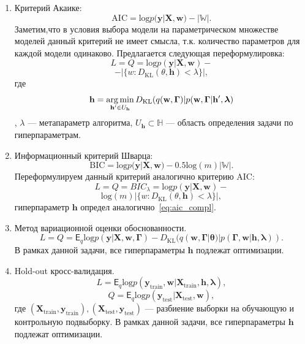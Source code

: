 \begin{enumerate}
\item Критерий Акаике:
\[
   \text{AIC} =  \text{log}p(\mathbf{y}|\mathbf{X}, \mathbf{w}) - |\mathbb{W}|.
\]
Заметим,что в условия выбора модели на параметрическом множестве моделей данный критерий не имеет смысла, т.к. количество параметров для каждой модели одинаково. Предлагается следующая переформулировка:
\begin{equation}
\label{eq:optim_aic}
    L = Q = \text{log}p(\mathbf{y}|\mathbf{X}, \mathbf{w}) - 
\end{equation}
\[
-|\{w: D_\text{KL}(\theta, \mathbf{h})<\lambda\}|,
\]
где 
\begin{equation}
\label{eq:aic_compl}
 \mathbf{h} = \operatorname*{arg\,min}_{\mathbf{h}' \in U_\mathbf{h}} D_\text{KL}(q(\mathbf{w}, \boldsymbol{\Gamma}) | p(\mathbf{w}, \boldsymbol{\Gamma}|\mathbf{h}',\boldsymbol{\lambda})\end{equation}, $\lambda$ --- метапараметр алгоритма, $U_\mathbf{h}  \subset \mathbb{H}$ --- область определения задачи по гиперпараметрам.

\item Информационный критерий Шварца:
\[
    \text{BIC} = \text{log}p(\mathbf{y}|\mathbf{X}, \mathbf{w}) - 0.5\text{log}(m)|\mathbb{W}|.
\]
Переформулируем данный критерий аналогично критерию AIC:
\begin{equation}
\label{eq:optim_bic}
    L = Q = BIC_{\lambda} = \text{log}p(\mathbf{y}|\mathbf{X}, \mathbf{w}) -
\end{equation}
\[
 \text{log}(m)|\{w: D_\text{KL}(\theta, \mathbf{h})<\lambda\}|,
\]
гиперпараметр $\mathbf{h}$ определ аналогично~\eqref{eq:aic_compl}.

\item Метод вариационной оценки обоснованности.
\begin{equation}
\label{eq:optim_elbo_method}   
    L = Q = \mathsf{E}_q \text{log}p(\mathbf{y}|\mathbf{X}, \mathbf{w}, \boldsymbol{\Gamma}) - D_\text{KL}(q(\mathbf{w}, \boldsymbol{\Gamma}|\boldsymbol{\theta})|p(\boldsymbol{\Gamma}, \mathbf{w}|\mathbf{h},\boldsymbol{\lambda})).
\end{equation}
В рамках данной задачи, все гиперпараметры $\mathbf{h}$ подлежат оптимизации.

\item Hold-out кросс-валидация.
\begin{equation}
\label{eq:optim_hold_out}
    L = \mathsf{E}_q \text{log}p(\mathbf{y}_\text{train}, \mathbf{w}|\mathbf{X}_\text{train}, \mathbf{h}, \boldsymbol{\lambda}),
\end{equation}
\[
    Q = \mathsf{E}_q \text{log}p(\mathbf{y}_\text{test}|\mathbf{X}_\text{test}, \mathbf{w}),
\]
где $(\mathbf{X}_\text{train}, \mathbf{y}_\text{train}), (\mathbf{X}_\text{test}, \mathbf{y}_\text{test})$ --- разбиение выборки на обучающую и контрольную подвыборку.
В рамках данной задачи, все гиперпараметры $\mathbf{h}$ подлежат оптимизации.

\end{enumerate}

